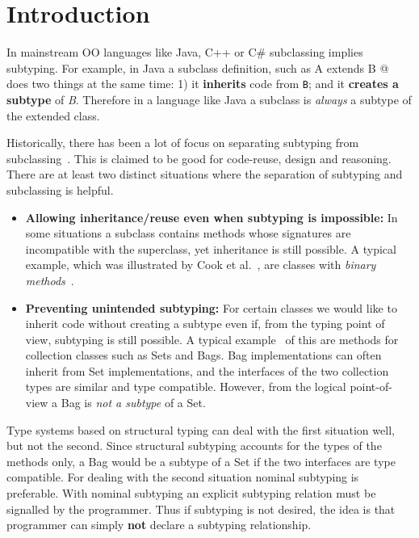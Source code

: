 \section{Introduction}\label{sec:intro}
\saveSpace\saveSpace
In mainstream OO languages like Java, C++ or C\# subclassing 
implies subtyping. For example, in Java a subclass definition, such as 
\Q@class A extends B {}@
\noindent does two things at the same time:
1) it {\bf inherits} code from \lstinline{B}; and it {\bf creates
a subtype} of \emph{B}. Therefore in a language like Java 
a subclass is \emph{always} a subtype of the extended class.

Historically, there has been a lot of focus on
separating subtyping from subclassing~\cite{cook}.  This is claimed to be
good for code-reuse, design and reasoning. There are at
least two distinct situations where the separation of subtyping and 
subclassing is helpful.

\begin{itemize}

\item {\bf Allowing inheritance/reuse even when subtyping is impossible:} 
In some situations a subclass contains methods whose signatures 
are incompatible with the superclass, yet inheritance is still
possible. A typical example, which was illustrated by Cook et al.~\cite{cook}, are 
classes with \emph{binary methods}~\cite{bruce96binary}.

\item {\bf Preventing unintended subtyping:} For certain classes we
  would like to inherit code without creating a subtype even if, from
  the typing point of view, subtyping is still possible. A typical
  example~\cite{LaLonde:1991:SSS:110673.110679} of this are methods for collection classes such as Sets and
  Bags. Bag implementations can often inherit 
  from Set implementations, and the interfaces of the two collection types are
  similar and type compatible. 
  However, from the logical point-of-view a Bag is \emph{not a
    subtype} of a Set. 

\end{itemize}

Type systems based on structural typing can deal with the first
situation well, but not the second. Since structural subtyping
accounts for the types of the methods only, a Bag would be a subtype
of a Set if the two interfaces are type compatible. For dealing with
the second situation nominal subtyping is preferable. With nominal
subtyping an explicit subtyping relation must be signalled by the
programmer. Thus if subtyping is not desired, the idea is that 
programmer can simply {\bf not} declare a subtyping relationship.

